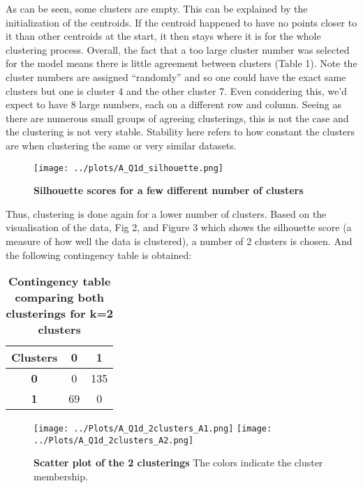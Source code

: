 \documentclass[12pt]{report} %
\begin{document}
As can be seen, some clusters are empty. This can be explained by the initialization of the centroids. If the centroid happened to have no points closer to it than other centroids at the start, it then stays where it is for the whole clustering process\cite{kmeans_sklearn}. Overall, the fact that a too large cluster number was selected for the model means there is little agreement between clusters (Table 1). Note the cluster numbers are assigned ``randomly'' and so one could have the exact same clusters but one is cluster 4 and the other cluster 7. Even considering this, we'd expect to have 8 large numbers, each on a different row and column. Seeing as there are numerous small groups of agreeing clusterings, this is not the case and the clustering is not very stable. Stability here refers to how constant the clusters are when clustering the same or very similar datasets. 

\begin{figure}[htbp]
    \centering
    \texttt{[image: ../plots/A\_Q1d\_silhouette.png]}
    \caption{\textbf{Silhouette scores for a few different number of clusters}}
\end{figure}

Thus, clustering is done again for a lower number of clusters. Based on the visualisation of the data, Fig 2, and Figure 3 which shows the silhouette score (a measure of how well the data is clustered)\cite[pp. 247-250]{sklearn_book}, a number of 2 clusters is chosen. And the following contingency table is obtained:

\begin{table}[h]
    \centering
    \begin{tabular}{ |c|c|c| }
        \hline
        \textbf{Clusters} & \textbf{0} & \textbf{1}\\ 
        \hline
        \textbf{0} & 0 & 135\\
        \hline
        \textbf{1} & 69 & 0 \\
        \hline
    \end{tabular}
    \caption{\textbf{Contingency table comparing both clusterings for k=2 clusters}}
    \end{table}


\begin{figure}[htbp]
    \centering
    \texttt{[image: ../Plots/A\_Q1d\_2clusters\_A1.png]}
    \texttt{[image: ../Plots/A\_Q1d\_2clusters\_A2.png]}
    \caption{\textbf{Scatter plot of the 2 clusterings} The colors indicate the cluster membership.}
\end{figure}
\end{document}
